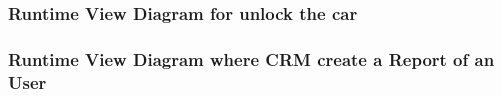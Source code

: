 \documentclass[a4paper]{article}
\begin{document}
\subsubsection{Runtime View Diagram for unlock the car}
\begin{figure}[h]
\centering
\vspace*{\fill}
\noindent{}%
\vspace*{0.1cm}
\end{figure}
\newpage
\subsubsection{Runtime View Diagram where CRM create a Report of an User }
\begin{figure}[h]
\centering
\vspace*{\fill}
\noindent{}%
\vspace*{0.1cm}
\end{figure}
\end{document}
